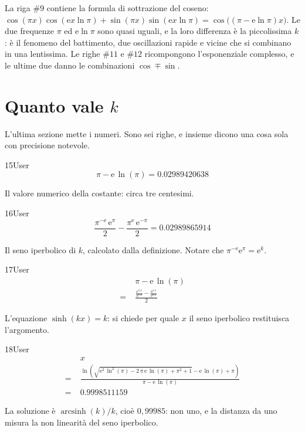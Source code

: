 La riga $\#9$ contiene la formula di sottrazione del coseno: $\cos(\pi x)\cos(\mathrm{e}x\ln\pi)+\sin(\pi x)\sin(\mathrm{e}x\ln\pi)=\cos\!\big((\pi-\mathrm{e}\ln\pi)x\big)$. Le due frequenze $\pi$ ed $\mathrm{e}\ln\pi$ sono quasi uguali, e la loro differenza è la piccolissima $k$: è il fenomeno del battimento, due oscillazioni rapide e vicine che si combinano in una lentissima. Le righe $\#11$ e $\#12$ ricompongono l'esponenziale complesso, e le ultime due danno le combinazioni $\cos\mp\sin$.

\section{Quanto vale $k$}

L'ultima sezione mette i numeri. Sono sei righe, e insieme dicono una cosa sola con precisione notevole.

\begin{espr}{15}{User}{\verificata}
\[
\pi - \mathrm{e}\, \ln\!\left(\pi\right) = 0.02989420638
\]
\end{espr}
Il valore numerico della costante: circa tre centesimi.

\begin{espr}{16}{User}{\verificata}
\[
\frac{\pi^{-\mathrm{e}}\, \mathrm{e}^{\pi}}{2} - \frac{\pi^{\mathrm{e}}\, \mathrm{e}^{-\pi}}{2} = 0.02989865914
\]
\end{espr}
Il seno iperbolico di $k$, calcolato dalla definizione. Notare che $\pi^{-\mathrm{e}}\mathrm{e}^{\pi}=\mathrm{e}^{k}$.

\begin{espr}{17}{User}{}
\begin{align*}
& \pi - \mathrm{e}\, \ln\!\left(\pi\right) \\
=\;& \frac{\frac{\mathrm{e}^{\pi\, x}}{\pi^{\mathrm{e}\, x}} - \frac{\pi^{\mathrm{e}\, x}}{\mathrm{e}^{\pi\, x}}}{2}
\end{align*}
\end{espr}
L'equazione $\sinh(kx)=k$: si chiede per quale $x$ il seno iperbolico restituisca l'argomento.

\begin{espr}{18}{User}{}
\begin{align*}
& x \\
=\;& \frac{\ln\!\left(\sqrt{\mathrm{e}^{2}\, \ln^{2}\!\left(\pi\right) - 2\, \pi\, \mathrm{e}\, \ln\!\left(\pi\right) + \pi^{2} + 1} - \mathrm{e}\, \ln\!\left(\pi\right) + \pi\right)}{\pi - \mathrm{e}\, \ln\!\left(\pi\right)} \\
=\;& 0.9998511159
\end{align*}
\end{espr}
La soluzione è $\operatorname{arcsinh}(k)/k$, cioè $0{,}99985$: non uno, e la distanza da uno misura la non linearità del seno iperbolico.

